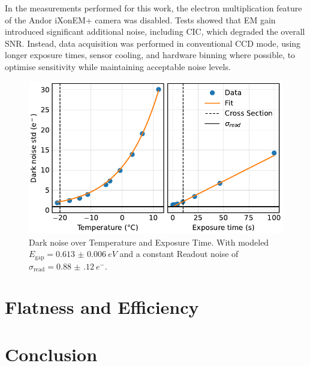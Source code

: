 \documentclass[
	parskip=half,
	a4paper,
]{scrarticle}
\begin{document}
In the measurements performed for this work, the electron multiplication feature of the Andor iXonEM+ camera was disabled. Tests showed that EM gain introduced significant additional noise, including CIC, which degraded the overall SNR. Instead, data acquisition was performed in conventional CCD mode, using longer exposure times, sensor cooling, and hardware binning where possible, to optimise sensitivity while maintaining acceptable noise levels.

\begin{figure}
    \centering
    \includegraphics{../analysis/figures/dark_noise.pdf}
    \caption{Dark noise over Temperature and Exposure Time. With modeled $E_\text{gap} = \SI{0.613(6)}{eV}$ and a constant Readout noise of $\sigma_{\text{read}} = \SI{0.88(12)}{e^-}$.}
\end{figure}


\section{Flatness and Efficiency}

\section*{Conclusion}

\clearpage
\printbibliography
\end{document}
